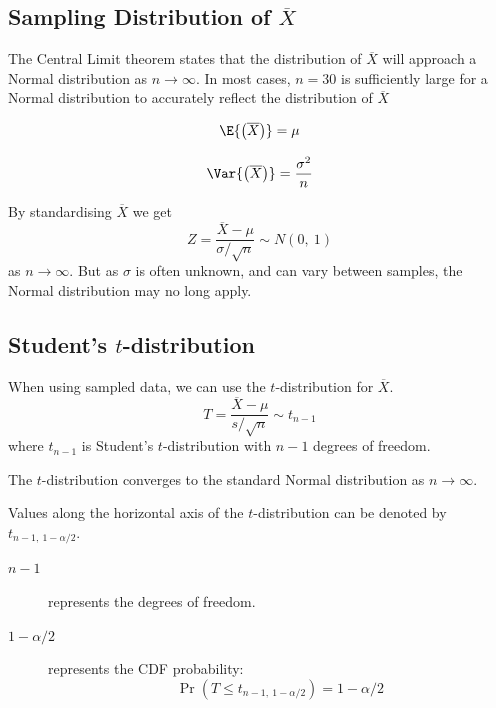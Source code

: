\documentclass{article}
\begin{document}
\subsection{Sampling Distribution of \texorpdfstring{\(\overline{X}\)}{X bar}}
The Central Limit theorem states that the distribution of \(\overline{X}\) will approach a
Normal distribution as \(n \to \infty \). In most cases, \(n = 30\) is sufficiently large for
a Normal distribution to accurately reflect the distribution of \(\overline{X}\)
\begin{theorem}
    \begin{equation*}
        \E{\left( \overline{X} \right)} = \mu
    \end{equation*}
\end{theorem}
\begin{theorem}
    \begin{equation*}
        \Var{\left( \overline{X} \right)} = \frac{\sigma^2}{n}
    \end{equation*}
\end{theorem}
By standardising \(\overline{X}\) we get
\begin{equation*}
    Z = \frac{\overline{X} - \mu}{\sigma/\sqrt{n}} \sim N(0,\: 1)
\end{equation*}
as \(n\to\infty\). But as \(\sigma \) is often unknown, and can vary between samples, the Normal
distribution may no long apply.
\subsection{Student's \texorpdfstring{\(t\)}{t}-distribution}
\begin{definition}
    When using sampled data, we can use the \(t\)-distribution for \(\overline{X}\).
    \begin{equation*}
        T = \frac{\overline{X} - \mu}{s/\sqrt{n}} \sim t_{n-1}
    \end{equation*}
    where \(t_{n-1}\) is Student's \(t\)-distribution with \(n-1\) degrees of freedom.

    The \(t\)-distribution converges to the standard Normal distribution as \(n\to\infty\).
\end{definition}
Values along the horizontal axis of the \(t\)-distribution can be denoted by \(t_{n-1,\: 1-\alpha/2}\).
\begin{description}
    \item[\(n-1\)] represents the degrees of freedom.
    \item[\(1-\alpha/2\)] represents the CDF probability:
        \begin{equation*}
            \Pr{\left( T \leq t_{n-1,\: 1-\alpha/2} \right)} = 1-\alpha/2
        \end{equation*}
\end{description}
\end{document}
